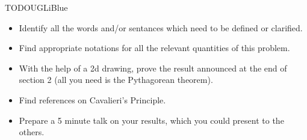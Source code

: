 \documentclass[12pt,a4paper]{nsiarticle}
\begin{document}

\begin{encadrecolore}{TODO}{UGLiBlue}
    \begin{itemize}
        \item Identify all the words and/or sentances which need to be defined or clarified.
        \item Find appropriate notations for all the relevant quantities of this problem.
        \item With the help of a 2d drawing, prove the result announced at the end of section 2 (all you need is the Pythagorean theorem).
        \item Find references on Cavalieri's Principle.
        \item Prepare a 5 minute talk on your results, which you could present to the others.
    \end{itemize}
\end{encadrecolore}
\end{document}
